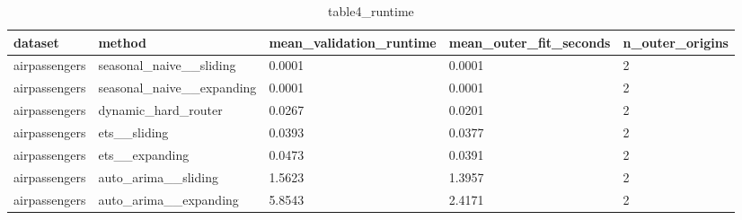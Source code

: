 \begin{table}[t]
\centering
\begin{tabular}{lllll}
\hline
dataset & method & mean\_validation\_runtime & mean\_outer\_fit\_seconds & n\_outer\_origins \\
\hline
airpassengers & seasonal\_naive\_\_sliding & 0.0001 & 0.0001 & 2 \\
airpassengers & seasonal\_naive\_\_expanding & 0.0001 & 0.0001 & 2 \\
airpassengers & dynamic\_hard\_router & 0.0267 & 0.0201 & 2 \\
airpassengers & ets\_\_sliding & 0.0393 & 0.0377 & 2 \\
airpassengers & ets\_\_expanding & 0.0473 & 0.0391 & 2 \\
airpassengers & auto\_arima\_\_sliding & 1.5623 & 1.3957 & 2 \\
airpassengers & auto\_arima\_\_expanding & 5.8543 & 2.4171 & 2 \\
\hline
\end{tabular}
\caption{table4\_runtime}
\end{table}
